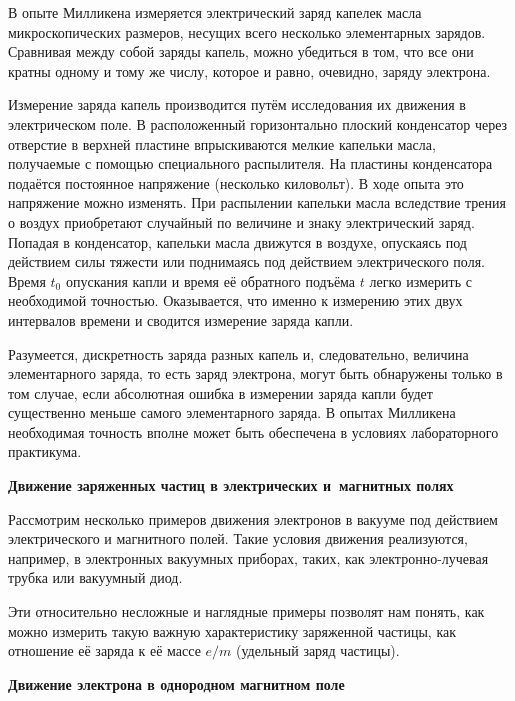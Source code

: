 В опыте Милликена измеряется электрический заряд капелек масла микроскопических размеров, несущих всего несколько
элементарных зарядов. Сравнивая между собой заряды капель, можно убедиться в том, что все они кратны одному и тому же числу, которое и равно, очевидно, заряду электрона.

Измерение заряда капель производится путём исследования их движения в электрическом поле. В расположенный горизонтально плоский конденсатор через отверстие в верхней пластине впрыскиваются мелкие капельки масла, получаемые с помощью специального распылителя. На пластины конденсатора подаётся постоянное напряжение (несколько киловольт). В ходе опыта это напряжение можно изменять. При распылении капельки масла вследствие трения о воздух приобретают случайный по величине и знаку электрический заряд. Попадая в конденсатор, капельки масла движутся в воздухе, опускаясь под действием силы тяжести или поднимаясь под действием электрического поля. Время $t_0$ опускания капли и время её обратного подъёма $t$ легко измерить с необходимой точностью. Оказывается, что именно к измерению этих двух интервалов времени и сводится измерение заряда капли.

Разумеется, дискретность заряда разных капель и, следовательно, величина элементарного заряда, то есть заряд электрона, могут быть обнаружены только в том случае, если абсолютная ошибка в измерении заряда капли будет существенно меньше самого элементарного заряда. В опытах Милликена необходимая точность вполне может быть обеспечена в условиях лабораторного практикума.

{\bf \Large Движение заряженных частиц в электрических и~магнитных полях}

Рассмотрим несколько примеров движения электронов в вакууме под действием электрического и магнитного полей. Такие
условия движения реализуются, например, в электронных вакуумных приборах, таких, как электронно-лучевая трубка или
вакуумный диод.

Эти относительно несложные и наглядные примеры позволят нам понять, как можно измерить такую важную характеристику
заряженной частицы, как отношение её заряда к её массе $e/m$ (удельный заряд частицы).

{\bf \large   Движение электрона в однородном магнитном поле}

\label{2.1}%

